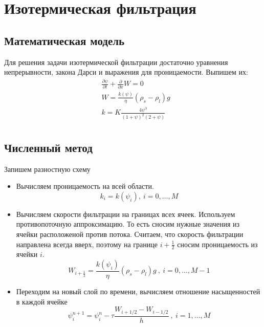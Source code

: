\documentclass[12pt,a4paper]{article}
\newcommand{\pd}[2]{\frac{\partial #1}{\partial #2}}
\begin{document}
\section{Изотермическая фильтрация}
\subsection{Математическая модель}
Для решения задачи изотермической фильтрации достаточно уравнения непрерывности, закона Дарси и выражения для проницаемости. Выпишем их:
\begin{equation}
\begin{aligned}
&\pd{\psi}{t} + \pd{}{x}W = 0\\
&W= \frac{k(\psi)}{\eta}(\rho_s-\rho_l)g\\
&k = K \frac{4\psi^3}{(1+\psi)^2(2+\psi)}\\
\label{isotermal}
\end{aligned}
\end{equation}

\subsection{Численный метод}
Запишем разностную схему
\begin{itemize}
\item Вычисляем проницаемость на всей области.
\begin{equation}
k_i = k(\psi_i) , \ i = 0,  \dots ,M
\label{perm_razn}
\end{equation}

\item Вычисляем скорости фильтрации на границах всех ячеек. Используем противопоточную аппроксимацию. То есть сносим нужные значения из ячейки расположеной против потока. Считаем, что скорость фильтрации направлена всегда вверх, поэтому на границе $i + \frac12$ сносим проницаемость из ячейки $i$.
\begin{equation}
W_{i+\frac12} = \frac{k(\psi_i)}{\eta}(\rho_s-\rho_l)g \ , \ i = 0,  \dots ,M-1
\label{Darsi_razn}
\end{equation}

\item Переходим на новый слой по времени, вычисляем отношение насыщенностей в каждой ячейке
\begin{equation}
\psi_i^{n+1} = \psi_i^n - \tau\frac{W_{i+1/2} - W_{i-1/2}}{h} \ , \ i = 1,  \dots ,M
\label{filtr_razn}
\end{equation}
\end{itemize}
\end{document}

